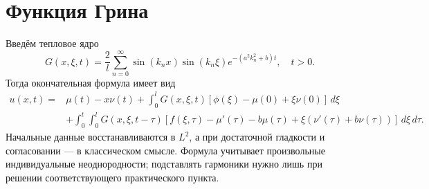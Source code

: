 \section{Функция Грина}
Введём тепловое ядро
\[
 \boxed{G(x,\xi,t)=\frac2l\sum_{n=0}^{\infty}
 \sin(k_nx)\sin(k_n\xi)e^{-(a^2k_n^2+b)t},\quad t>0.}
\]
Тогда окончательная формула имеет вид
\[
\boxed{\begin{aligned}
 u(x,t)={}&\mu(t)-x\nu(t)
 +\int_0^lG(x,\xi,t)[\phi(\xi)-\mu(0)+\xi\nu(0)]\,d\xi\\
 &+\int_0^t\int_0^lG(x,\xi,t-\tau)
 [f(\xi,\tau)-\mu'(\tau)-b\mu(\tau)
       +\xi(\nu'(\tau)+b\nu(\tau))]\,d\xi\,d\tau.
\end{aligned}}
\]
Начальные данные восстанавливаются в $L^2$, а при достаточной гладкости
и согласовании --- в классическом смысле. Формула учитывает произвольные
индивидуальные неоднородности; подставлять гармоники нужно лишь при
решении соответствующего практического пункта.
